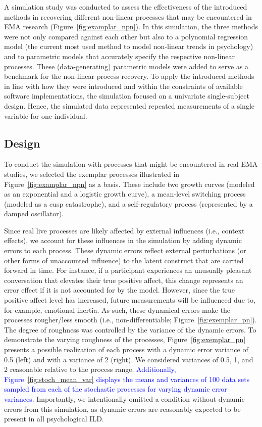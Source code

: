 \documentclass[man, floatsintext]{apa7}
\begin{document}
A simulation study was conducted to assess the effectiveness of the introduced
methods in recovering different non-linear processes that may be encountered in
EMA research (Figure~\ref{fig:examplar_npn}). In this simulation, the three
methods were not only compared against each other but also to a polynomial
regression model (the current most used method to model non-linear trends in
psychology) and to parametric models that accurately specify the respective
non-linear processes. These (data-generating) parametric models were added to
serve as a benchmark for the non-linear process recovery. To apply the
introduced methods in line with how they were introduced and within the
constraints of available software implementations, the simulation focused on a
univariate single-subject design. Hence, the simulated data represented
repeated measurements of a single variable for one individual.

\subsection{Design}

To conduct the simulation with processes that might be encountered in real EMA
studies, we selected the exemplar processes illustrated in
Figure~\ref{fig:examplar_npn} as a basis. These include two growth curves
(modeled as an exponential and a logistic growth curve), a mean-level switching
process (modeled as a cusp catastrophe), and a self-regulatory process
(represented by a damped oscillator).

Since real live processes are likely affected by external influences (i.e.,
context effects), we account for these influences in the simulation by adding
dynamic errors to each process. These dynamic errors reflect external
perturbations (or other forms of unaccounted influence) to the latent construct
that are carried forward in time. For instance, if a participant experiences an
unusually pleasant conversation that elevates their true positive affect, this
change represents an error effect if it is not accounted for by the model.
However, since the true positive affect level has increased, future
measurements will be influenced due to, for example, emotional inertia. As
such, these dynamical errors make the processes rougher/less smooth (i.e.,
non-differentiable; Figure~\ref{fig:exemplar_pn}). The degree of roughness was
controlled by the variance of the dynamic errors. To demonstrate the varying
roughness of the processes, Figure~\ref{fig:exemplar_pn} presents a possible
realization of each process with a dynamic error variance of 0.5 (left) and
with a variance of 2 (right). We considered variances of 0.5, 1, and 2
reasonable relative to the process range. \textcolor{blue}{ Additionally,
  Figure~\ref{fig:stoch_mean_var} displays the means and variances of 100 data
  sets sampled from each of the stochastic processes for varying dynamic error
  variances.} Importantly, we intentionally omitted a condition without
dynamic
errors from this simulation, as dynamic errors are reasonably expected to be
present in all psychological ILD\@.
\end{document}
